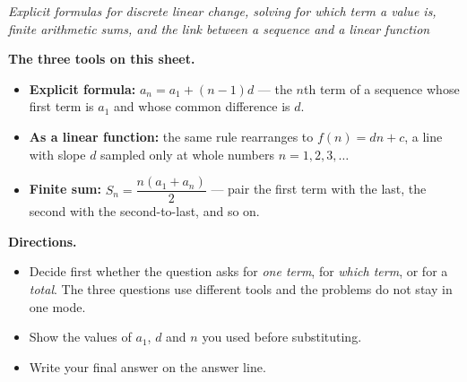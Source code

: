 \documentclass[12pt]{article}
\begin{document}

\begin{center}
\textit{Explicit formulas for discrete linear change, solving for which term a
value is, finite arithmetic sums, and the link between a sequence and a linear
function}
\end{center}

\noindent\textbf{The three tools on this sheet.}
\begin{itemize}[leftmargin=1.2cm, itemsep=2pt, topsep=2pt]
\item \textbf{Explicit formula:} $a_n = a_1 + (n-1)d$ --- the $n$th term of a
sequence whose first term is $a_1$ and whose common difference is $d$.
\item \textbf{As a linear function:} the same rule rearranges to $f(n) = dn + c$,
a line with slope $d$ sampled only at whole numbers $n = 1, 2, 3, \ldots$
\item \textbf{Finite sum:} $S_n = \dfrac{n(a_1 + a_n)}{2}$ --- pair the first
term with the last, the second with the second-to-last, and so on.
\end{itemize}

\noindent\textbf{Directions.}
\begin{itemize}[leftmargin=1.2cm, itemsep=2pt, topsep=2pt]
\item Decide first whether the question asks for \emph{one term}, for
\emph{which term}, or for a \emph{total}. The three questions use different
tools and the problems do not stay in one mode.
\item Show the values of $a_1$, $d$ and $n$ you used before substituting.
\item Write your final answer on the answer line.
\end{itemize}



\end{document}
